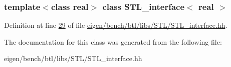 \subsubsection*{template$<$class real$>$\newline
class S\+T\+L\+\_\+interface$<$ real $>$}



Definition at line \hyperlink{eigen_2bench_2btl_2libs_2_s_t_l_2_s_t_l__interface_8hh_source_l00029}{29} of file \hyperlink{eigen_2bench_2btl_2libs_2_s_t_l_2_s_t_l__interface_8hh_source}{eigen/bench/btl/libs/\+S\+T\+L/\+S\+T\+L\+\_\+interface.\+hh}.



The documentation for this class was generated from the following file\+:\begin{DoxyCompactItemize}
\item 
eigen/bench/btl/libs/\+S\+T\+L/\+S\+T\+L\+\_\+interface.\+hh\end{DoxyCompactItemize}
